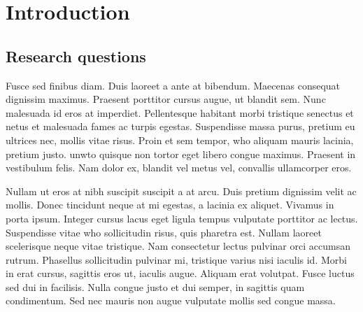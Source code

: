\documentclass[draft=false
              ,paper=a4
              ,twoside=false
              ,fontsize=12pt
              ,headsepline
              ,BCOR10mm
              ,DIV11
              ]{scrbook}
\begin{document}

\frontmatter




\tableofcontents
{}
\listoffigures
{}
\listoftables
{}

\mainmatter
\chapter{Introduction}
\vspace{6pt}
\section{Research questions}
\vspace{6pt}

Fusce sed finibus diam. Duis laoreet a ante at bibendum. Maecenas consequat dignissim maximus. Praesent porttitor cursus augue, ut blandit sem. Nunc malesuada id eros at imperdiet. Pellentesque habitant morbi tristique senectus et netus et malesuada fames ac turpis egestas. Suspendisse massa purus, pretium eu ultrices nec, mollis vitae risus. Proin et sem tempor, \gls{who} aliquam mauris lacinia, pretium justo. \gls{unwto} quisque non tortor eget libero congue maximus. Praesent in vestibulum felis. Nam dolor ex, blandit vel metus vel, convallis ullamcorper eros.

Nullam ut eros at nibh suscipit suscipit a at arcu. Duis pretium dignissim velit ac mollis. Donec tincidunt neque at mi egestas, a lacinia ex aliquet. Vivamus in porta ipsum. Integer cursus lacus eget ligula tempus vulputate porttitor ac lectus. Suspendisse vitae \gls{who} sollicitudin risus, quis pharetra est. Nullam laoreet scelerisque neque vitae tristique. Nam consectetur lectus pulvinar orci accumsan rutrum. Phasellus sollicitudin pulvinar mi, tristique varius nisi iaculis id. Morbi in erat cursus, sagittis eros ut, iaculis augue. Aliquam erat volutpat. Fusce luctus sed dui in facilisis. Nulla congue justo et dui semper, in sagittis quam condimentum. Sed nec mauris non augue vulputate mollis sed congue massa.
\end{document}
